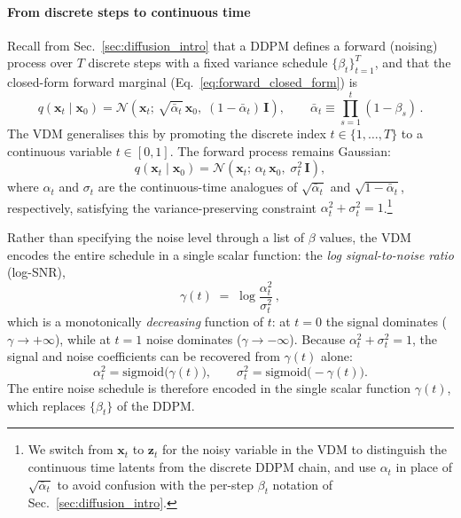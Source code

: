 \paragraph{From discrete steps to continuous time}
\label{sec:vdm_continuous}

Recall from Sec.~\ref{sec:diffusion_intro} that a DDPM defines a forward (noising) process over $T$ discrete steps with a fixed variance schedule $\{\beta_t\}_{t=1}^{T}$, and that the closed-form forward marginal (Eq.~\ref{eq:forward_closed_form}) is
\begin{equation}
    q(\bm{x}_t \mid \bm{x}_0) = \mathcal{N}\!\left(\bm{x}_t;\, \sqrt{\bar\alpha_t}\,\bm{x}_0,\; (1-\bar\alpha_t)\,\bm{I}\right), \qquad \bar\alpha_t \equiv \prod_{s=1}^{t}(1-\beta_s)\,.
    \label{eq:forward_marginal_recap}
\end{equation}
The VDM generalises this by promoting the discrete index $t \in \{1,\dots,T\}$ to a continuous variable $t \in [0,1]$. The forward process remains Gaussian:
\begin{equation}
    q(\bm{x}_t \mid \bm{x}_0) = \mathcal{N}\!\left(\bm{x}_t;\, \alpha_t\,\bm{x}_0,\; \sigma_t^2\,\bm{I}\right),
    \label{eq:vdm_forward}
\end{equation}
where $\alpha_t$ and $\sigma_t$ are the continuous-time analogues of $\sqrt{\bar\alpha_t}$ and $\sqrt{1-\bar\alpha_t}$, respectively, satisfying the variance-preserving constraint $\alpha_t^2 + \sigma_t^2 = 1$.\footnote{We switch from $\bm{x}_t$ to $\bm{z}_t$ for the noisy variable in the VDM to distinguish the continuous time latents from the discrete DDPM chain, and use $\alpha_t$ in place of $\sqrt{\bar\alpha_t}$ to avoid confusion with the per-step $\beta_t$ notation of Sec.~\ref{sec:diffusion_intro}.}

Rather than specifying the noise level through a list of $\beta$ values, the VDM encodes the entire schedule in a single scalar function: the \emph{log signal-to-noise ratio} (log-SNR),
\begin{equation}
    \gamma(t) \;=\; \log\frac{\alpha_t^2}{\sigma_t^2}\,,
    \label{eq:log_snr}
\end{equation}
which is a monotonically \emph{decreasing} function of $t$: at $t=0$ the signal dominates ($\gamma \to +\infty$), while at $t=1$ noise dominates ($\gamma \to -\infty$). Because $\alpha_t^2 + \sigma_t^2 = 1$, the signal and noise coefficients can be recovered from $\gamma(t)$ alone:
\begin{equation}
    \alpha_t^2 = \mathrm{sigmoid}\!\big(\gamma(t)\big), \qquad
    \sigma_t^2 = \mathrm{sigmoid}\!\big({-}\gamma(t)\big).
    \label{eq:a_sigma_from_gamma}
\end{equation}
The entire noise schedule is therefore encoded in the single scalar function $\gamma(t)$, which replaces $\{\beta_t\}$ of the DDPM.



